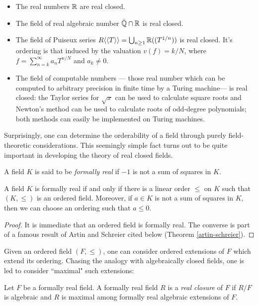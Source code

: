 \begin{example}
	\begin{itemize}
		\item The real numbers $\mathbb{R}$ are real closed. 
		\item The field of real algebraic number $\bar{\mathbb{Q}}\cap \mathbb{R}$ is real closed.
		\item The field of Puiseux series $R\langle\langle T\rangle\rangle=\bigcup_{n\geq 1} \mathbb{R}((T^{1/n}))$ is real closed. It's ordering is that induced by the valuation $v(f)=k/N$, where $f=\sum\limits_{n=k}^{\infty} a_nT^{n/N}$ and $a_k\neq 0$.
		\item The field of computable numbers --- those real number which can be computed to arbitrary precision in finite time by a Turing machine--- is real closed: the Taylor series for $\sqrt{x}$ can be used to calculate square roots and Newton's method can be used to calculate roots of odd-degree polynomials; both methods can easily be implemented on Turing machines.
	\end{itemize}
\end{example}

Surprisingly, one can determine the orderability of a field through purely field-theoretic considerations. This seemingly simple fact turns out to be quite important in developing the theory of real closed fields.

\begin{definition}
A field $K$ is said to be \emph{formally real} if $-1$ is not a sum of squares in $K$.
\end{definition}
\begin{theorem}
\label{formallyreal-orderability}
A field $K$ is formally real if and only if there is a linear order $\leq$ on $K$ such that $(K,\leq)$ is an ordered field. Moreover, if $a\in K$ is not a sum of squares in $K$, then we can choose an ordering such that $a\leq 0$. 
\end{theorem}
\begin{proof}
It is immediate that an ordered field is formally real. The converse is part of a famous result of Artin and Schreier cited below (Theorem \ref{artin-schreier}).
\end{proof}

Given an ordered field $(F,\leq)$, one can consider ordered extensions of $F$ which extend its ordering. Chasing the analogy with algebraically closed fields, one is led to consider ``maximal" such extensions:

\begin{definition}
Let $F$ be a formally real field. A formally real field $R$ is a \emph{real closure} of $F$ if $R/F$ is algebraic and $R$ is maximal among formally real algebraic extensions of $F$.
\end{definition}

